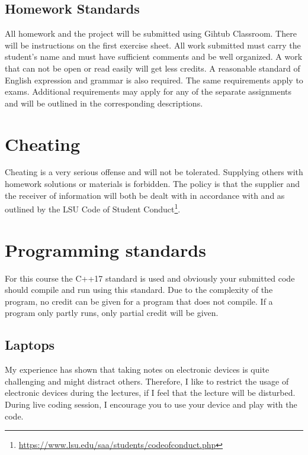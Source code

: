 \documentclass[11pt,letterpaper]{article}
\begin{document}
\subsection*{Homework Standards}
All homework and the project will be submitted using Gihtub Classroom. There will be instructions on the first exercise sheet. All work submitted must carry the student's name and must have sufficient comments and be well organized. A work that can not be open or read easily will get less credits.  A  reasonable standard  of  English  expression  and  grammar  is  also  required.  The  same  requirements  apply  to  exams. Additional requirements   may   apply   for   any   of   the   separate   assignments   and   will   be   outlined   in   the   corresponding descriptions.
 
\section*{Cheating}
Cheating is a very serious offense and will not be tolerated. Supplying others with homework solutions or materials is forbidden. The  policy  is  that  the supplier and the receiver of information will both be dealt with in accordance with and as outlined by the LSU Code of Student Conduct\footnote{\url{https://www.lsu.edu/saa/students/codeofconduct.php}}.

\section*{Programming standards}
For this course the C++17 standard is used and obviously your submitted code should compile and run using this standard. Due to the complexity of the program, no credit can be given for a program that does not compile. If a program only partly runs, only partial credit will be given.

\subsection*{Laptops}
My experience has shown that taking notes on electronic devices is quite challenging and might distract others. Therefore, I like to restrict the usage of electronic devices during the lectures, if I feel that the lecture will be disturbed. During live coding session, I encourage you to use your device and play with the code.

\doclicenseThis
\end{document}
